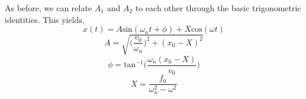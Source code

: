 \documentclass[12pt,letter]{article}
\numberwithin{ex}{section} %
\numberwithin{re}{section} %
\numberwithin{vcs}{section} %
\begin{document}
			As before, we can relate $A_1$ and $A_2$ to each other through the basic trigonometric identities. This yields, 
			\begin{equation}
				x(t) = A\text{sin}(\omega_n t + \phi) + X\text{cos}(\omega t) 
			\end{equation}				
			\begin{equation}
				A = \sqrt{\bigg(\frac{v_0}{\omega_n}\bigg)^2+(x_0-X)^2}
			\end{equation}				
			\begin{equation}
				\phi = \text{tan}^{-1}\bigg(\frac{\omega_n(x_0-X)}{v_0}\bigg)
			\end{equation}				
			\begin{equation}
				X = \frac{f_0}{\omega_n^2-\omega^2}
			\end{equation}				
			
\end{document}
